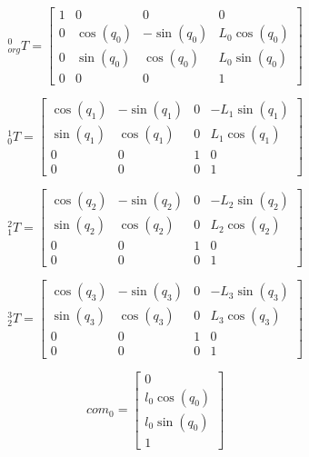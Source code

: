 \documentclass{article}
\begin{document}
\begin{equation}
	{}_{org}^0 T = \begin{bmatrix}
	1 & 0 & 0 & 0\\
	0 & \cos{(q_{0} )} & - \sin{(q_{0} )} & L_{0} \cos{(q_{0} )}\\
	0 & \sin{(q_{0} )} & \cos{(q_{0} )} & L_{0} \sin{(q_{0} )}\\
	0 & 0 & 0 & 1
\end{bmatrix}
\end{equation}

\begin{equation}
	{}_0^1 T = \begin{bmatrix}
	\cos{(q_{1} )} & - \sin{(q_{1} )} & 0 & -L_{1} \sin{(q_{1} )}\\
	\sin{(q_{1} )} & \cos{(q_{1} )} & 0 & L_{1} \cos{(q_{1} )}\\
	0 & 0 & 1 & 0\\
	0 & 0 & 0 & 1
\end{bmatrix}
\end{equation}

\begin{equation}
	{}_1^2 T = \begin{bmatrix}
 	\cos{(q_{2} )} & - \sin{(q_{2} )} & 0 & -L_{2} \sin{(q_{2} )}\\
 	\sin{(q_{2} )} & \cos{(q_{2} )} & 0 & L_{2} \cos{(q_{2} )}\\
 	0 & 0 & 1 & 0\\
 	0 & 0 & 0 & 1
\end{bmatrix}
\end{equation}

\begin{equation}
	{}_2^3 T = \begin{bmatrix}
 	\cos{(q_{3} )} & - \sin{(q_{3} )} & 0 & -L_{3} \sin{(q_{3} )}\\
 	\sin{(q_{3} )} & \cos{(q_{3} )} & 0 & L_{3} \cos{(q_{3} )}\\
 	0 & 0 & 1 & 0\\
 	0 & 0 & 0 & 1
\end{bmatrix}
\end{equation}


\begin{equation}
	com_0 = \begin{bmatrix}
 	0\\
 	l_{0} \cos{(q_{0} )}\\
 	l_{0} \sin{(q_{0} )}\\
 	1
\end{bmatrix}
\end{equation}
\end{document}
